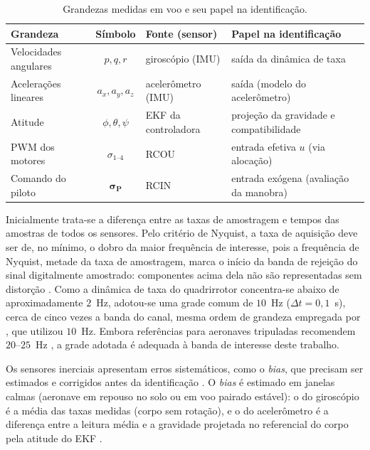\begin{table}[ht]
\centering
\caption{Grandezas medidas em voo e seu papel na identificação.}
\label{tab:medidas}
\small
\begin{tabular}{@{}l c l p{4.6cm}@{}}
\toprule
Grandeza & Símbolo & Fonte (sensor) & Papel na identificação \\
\midrule
Velocidades angulares & $p,q,r$ & giroscópio (IMU) & saída da dinâmica de taxa \\
Acelerações lineares & $a_x,a_y,a_z$ & acelerômetro (IMU) & saída (modelo do acelerômetro) \\
Atitude & $\phi,\theta,\psi$ & EKF da controladora & projeção da gravidade e compatibilidade \\
PWM dos motores & $\sigma_{1\text{--}4}$ & RCOU & entrada efetiva $u$ (via alocação) \\
Comando do piloto & $\boldsymbol{\sigma_P}$ & RCIN & entrada exógena (avaliação da manobra) \\
\bottomrule
\end{tabular}
\end{table}

Inicialmente trata-se a diferença entre as taxas de amostragem e tempos das amostras de todos os sensores. Pelo critério de Nyquist, a taxa de aquisição deve ser de, no mínimo, o dobro da maior frequência de interesse, pois a frequência de Nyquist, metade da taxa de amostragem, marca o início da banda de rejeição do sinal digitalmente amostrado: componentes acima dela não são representadas sem distorção \cite{Jategaonkar2015}. Como a dinâmica de taxa do quadrirrotor concentra-se abaixo de aproximadamente $2$~Hz, adotou-se uma grade comum de $10$~Hz ($\Delta t = 0{,}1$~s), cerca de cinco vezes a banda do canal, mesma ordem de grandeza empregada por \textcite{Sato2021}, que utilizou $10$~Hz. Embora referências para aeronaves tripuladas recomendem $20$--$25$~Hz \cite{Jategaonkar2015}, a grade adotada é adequada à banda de interesse deste trabalho.

Os sensores inerciais apresentam erros sistemáticos, como o \textit{bias}, que precisam ser estimados e corrigidos antes da identificação \cite{Jategaonkar2015, Sato2021}. O \textit{bias} é estimado em janelas calmas (aeronave em repouso no solo ou em voo pairado estável): o do giroscópio é a média das taxas medidas (corpo sem rotação), e o do acelerômetro é a diferença entre a leitura média e a gravidade projetada no referencial do corpo pela atitude do EKF \cite{Jategaonkar2015}.

